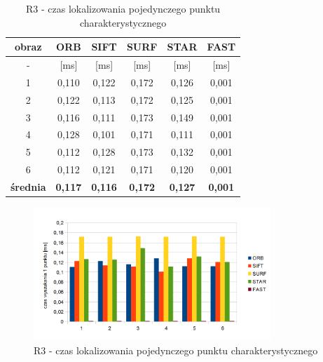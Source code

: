 \begin{table}[htbp]
  \centering
  \caption{R3 - czas lokalizowania pojedynczego punktu charakterystycznego}
    \begin{tabular}{|c|c|c|c|c|c|}
    \hline
    obraz & \textbf{ORB} & \textbf{SIFT} & \textbf{SURF} & \textbf{STAR} & \textbf{FAST} \\
    \hline
    -  & [ms] & [ms] & [ms] & [ms] & [ms] \\\hline
    1 & 0,110 & 0,122 & 0,172 & 0,126 & 0,001 \\
    2 & 0,122 & 0,113 & 0,172 & 0,125 & 0,001 \\
    3 & 0,116 & 0,111 & 0,173 & 0,149 & 0,001 \\
    4 & 0,128 & 0,101 & 0,171 & 0,111 & 0,001 \\
    5 & 0,112 & 0,128 & 0,173 & 0,132 & 0,001 \\
    6 & 0,112 & 0,121 & 0,171 & 0,120 & 0,001 \\\hline
    \textbf{średnia} & \textbf{0,117} & \textbf{0,116} & \textbf{0,172} & \textbf{0,127} & \textbf{0,001} \\
    \hline
    \end{tabular}%
  \label{tab:r3_f2}%
\end{table}%


\begin{figure}
\centering
\includegraphics[width=0.8\textwidth]{pict/slowik/r3/f2.png}
\caption{R3 - czas lokalizowania pojedynczego punktu charakterystycznego}
\label{fig:r3_f2}
\end{figure}


